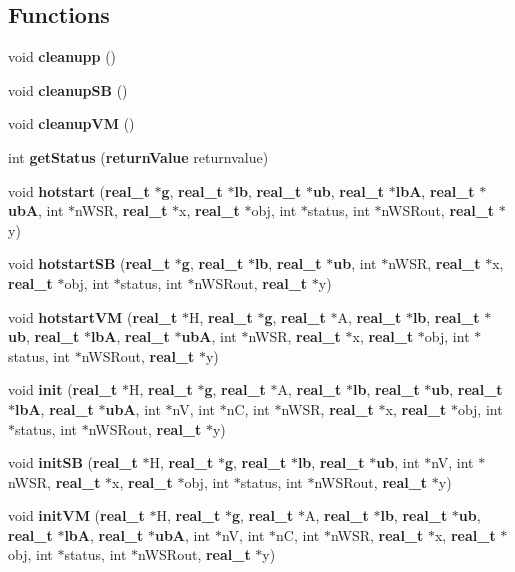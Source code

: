\subsection*{Functions}
\begin{DoxyCompactItemize}
\item 
void {\bf cleanupp} ()
\item 
void {\bf cleanupSB} ()
\item 
void {\bf cleanupVM} ()
\item 
int {\bf getStatus} ({\bf returnValue} returnvalue)
\item 
void {\bf hotstart} ({\bf real\_\-t} $\ast${\bf g}, {\bf real\_\-t} $\ast${\bf lb}, {\bf real\_\-t} $\ast${\bf ub}, {\bf real\_\-t} $\ast${\bf lbA}, {\bf real\_\-t} $\ast${\bf ubA}, int $\ast$nWSR, {\bf real\_\-t} $\ast$x, {\bf real\_\-t} $\ast$obj, int $\ast$status, int $\ast$nWSRout, {\bf real\_\-t} $\ast$y)
\item 
void {\bf hotstartSB} ({\bf real\_\-t} $\ast${\bf g}, {\bf real\_\-t} $\ast${\bf lb}, {\bf real\_\-t} $\ast${\bf ub}, int $\ast$nWSR, {\bf real\_\-t} $\ast$x, {\bf real\_\-t} $\ast$obj, int $\ast$status, int $\ast$nWSRout, {\bf real\_\-t} $\ast$y)
\item 
void {\bf hotstartVM} ({\bf real\_\-t} $\ast$H, {\bf real\_\-t} $\ast${\bf g}, {\bf real\_\-t} $\ast$A, {\bf real\_\-t} $\ast${\bf lb}, {\bf real\_\-t} $\ast${\bf ub}, {\bf real\_\-t} $\ast${\bf lbA}, {\bf real\_\-t} $\ast${\bf ubA}, int $\ast$nWSR, {\bf real\_\-t} $\ast$x, {\bf real\_\-t} $\ast$obj, int $\ast$status, int $\ast$nWSRout, {\bf real\_\-t} $\ast$y)
\item 
void {\bf init} ({\bf real\_\-t} $\ast$H, {\bf real\_\-t} $\ast${\bf g}, {\bf real\_\-t} $\ast$A, {\bf real\_\-t} $\ast${\bf lb}, {\bf real\_\-t} $\ast${\bf ub}, {\bf real\_\-t} $\ast${\bf lbA}, {\bf real\_\-t} $\ast${\bf ubA}, int $\ast$nV, int $\ast$nC, int $\ast$nWSR, {\bf real\_\-t} $\ast$x, {\bf real\_\-t} $\ast$obj, int $\ast$status, int $\ast$nWSRout, {\bf real\_\-t} $\ast$y)
\item 
void {\bf initSB} ({\bf real\_\-t} $\ast$H, {\bf real\_\-t} $\ast${\bf g}, {\bf real\_\-t} $\ast${\bf lb}, {\bf real\_\-t} $\ast${\bf ub}, int $\ast$nV, int $\ast$nWSR, {\bf real\_\-t} $\ast$x, {\bf real\_\-t} $\ast$obj, int $\ast$status, int $\ast$nWSRout, {\bf real\_\-t} $\ast$y)
\item 
void {\bf initVM} ({\bf real\_\-t} $\ast$H, {\bf real\_\-t} $\ast${\bf g}, {\bf real\_\-t} $\ast$A, {\bf real\_\-t} $\ast${\bf lb}, {\bf real\_\-t} $\ast${\bf ub}, {\bf real\_\-t} $\ast${\bf lbA}, {\bf real\_\-t} $\ast${\bf ubA}, int $\ast$nV, int $\ast$nC, int $\ast$nWSR, {\bf real\_\-t} $\ast$x, {\bf real\_\-t} $\ast$obj, int $\ast$status, int $\ast$nWSRout, {\bf real\_\-t} $\ast$y)

\end{DoxyCompactItemize}
